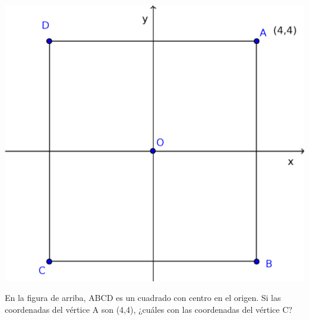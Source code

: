 \documentclass[letterpaper,10pt]{examdesign}
\begin{document}
\begin{multiplechoice}[keycolumns=4,examcolumns=2]
\begin{block}
\includegraphics[scale=.65]{Images/cuadrado4-4.png}
\begin{question}
En la figura de arriba, ABCD es un cuadrado con centro en el origen. Si las coordenadas del vértice A son (4,4), ¿cuáles con las coordenadas del vértice C?
\end{question}
\end{block}
\end{multiplechoice}
\end{document}
